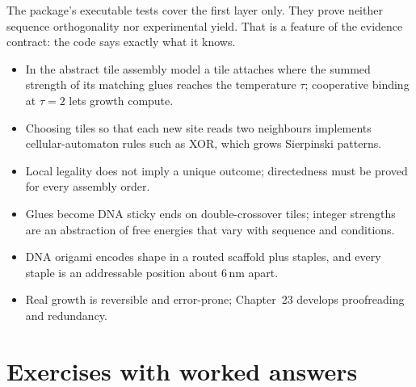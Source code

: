 The package's executable tests cover the first layer only. They prove neither
sequence orthogonality nor experimental yield. That is a feature of the
evidence contract: the code says exactly what it knows.

\begin{KeyIdeas}
\begin{itemize}\setlength{\itemsep}{2pt}
\item In the abstract tile assembly model a tile attaches where the summed
strength of its matching glues reaches the temperature $\tau$; cooperative binding
at $\tau=2$ lets growth compute.
\item Choosing tiles so that each new site reads two neighbours implements
cellular-automaton rules such as XOR, which grows Sierpinski patterns.
\item Local legality does not imply a unique outcome; directedness must be proved
for every assembly order.
\item Glues become DNA sticky ends on double-crossover tiles; integer strengths
are an abstraction of free energies that vary with sequence and conditions.
\item DNA origami encodes shape in a routed scaffold plus staples, and every
staple is an addressable position about 6\,nm apart.
\item Real growth is reversible and error-prone; Chapter~23 develops proofreading
and redundancy.
\end{itemize}
\end{KeyIdeas}

\section{Exercises with worked answers}

